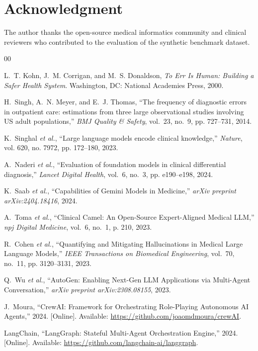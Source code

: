 \documentclass[conference]{IEEEtran}
\begin{document}
\section*{Acknowledgment}
The author thanks the open-source medical informatics community and clinical reviewers who contributed to the evaluation of the synthetic benchmark dataset.


\begin{thebibliography}{00}

L.~T. Kohn, J.~M. Corrigan, and M.~S. Donaldson, \emph{To Err Is Human: Building a Safer Health System}. Washington, DC: National Academies Press, 2000.

H.~Singh, A.~N. Meyer, and E.~J. Thomas, ``The frequency of diagnostic errors in outpatient care: estimations from three large observational studies involving US adult populations,'' \emph{BMJ Quality \& Safety}, vol.~23, no.~9, pp. 727--731, 2014.

K.~Singhal \emph{et al.}, ``Large language models encode clinical knowledge,'' \emph{Nature}, vol. 620, no. 7972, pp. 172--180, 2023.

A.~Naderi \emph{et al.}, ``Evaluation of foundation models in clinical differential diagnosis,'' \emph{Lancet Digital Health}, vol.~6, no.~3, pp. e190--e198, 2024.

K.~Saab \emph{et al.}, ``Capabilities of Gemini Models in Medicine,'' \emph{arXiv preprint arXiv:2404.18416}, 2024.

A.~Toma \emph{et al.}, ``Clinical Camel: An Open-Source Expert-Aligned Medical LLM,'' \emph{npj Digital Medicine}, vol.~6, no.~1, p. 210, 2023.

R.~Cohen \emph{et al.}, ``Quantifying and Mitigating Hallucinations in Medical Large Language Models,'' \emph{IEEE Transactions on Biomedical Engineering}, vol.~70, no.~11, pp. 3120--3131, 2023.

Q.~Wu \emph{et al.}, ``AutoGen: Enabling Next-Gen LLM Applications via Multi-Agent Conversation,'' \emph{arXiv preprint arXiv:2308.08155}, 2023.

J.~Moura, ``CrewAI: Framework for Orchestrating Role-Playing Autonomous AI Agents,'' 2024. [Online]. Available: \url{https://github.com/joaomdmoura/crewAI}.

LangChain, ``LangGraph: Stateful Multi-Agent Orchestration Engine,'' 2024. [Online]. Available: \url{https://github.com/langchain-ai/langgraph}.


\end{thebibliography}
\end{document}
